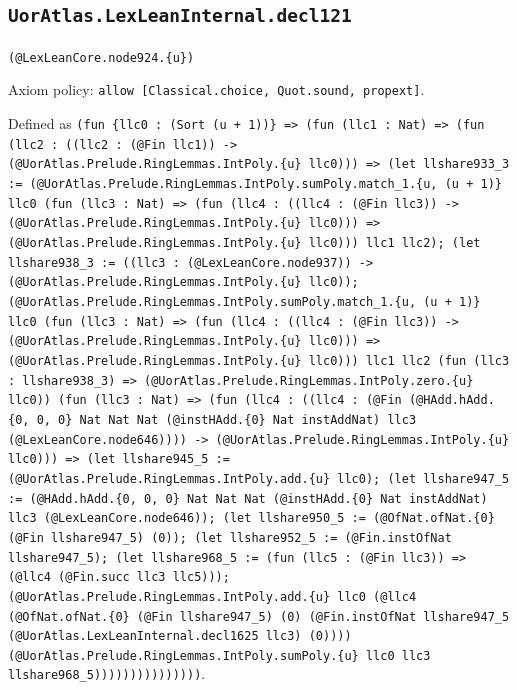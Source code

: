 \documentclass[11pt]{article}
\begin{document}
\subsection*{\texttt{UorAtlas.LexLeanInternal.decl121}}
\noindent\texttt{(@LexLeanCore.node924.\{u\})}\par
\noindent Axiom policy: \texttt{allow [Classical.choice, Quot.sound, propext]}.\par
\noindent Defined as \texttt{(fun \{llc0 : (Sort (u + 1))\} => (fun (llc1 : Nat) => (fun (llc2 : ((llc2 : (@Fin llc1)) -> (@UorAtlas.Prelude.RingLemmas.IntPoly.\{u\} llc0))) => (let llshare933\_3 := (@UorAtlas.Prelude.RingLemmas.IntPoly.sumPoly.match\_1.\{u, (u + 1)\} llc0 (fun (llc3 : Nat) => (fun (llc4 : ((llc4 : (@Fin llc3)) -> (@UorAtlas.Prelude.RingLemmas.IntPoly.\{u\} llc0))) => (@UorAtlas.Prelude.RingLemmas.IntPoly.\{u\} llc0))) llc1 llc2); (let llshare938\_3 := ((llc3 : (@LexLeanCore.node937)) -> (@UorAtlas.Prelude.RingLemmas.IntPoly.\{u\} llc0)); (@UorAtlas.Prelude.RingLemmas.IntPoly.sumPoly.match\_1.\{u, (u + 1)\} llc0 (fun (llc3 : Nat) => (fun (llc4 : ((llc4 : (@Fin llc3)) -> (@UorAtlas.Prelude.RingLemmas.IntPoly.\{u\} llc0))) => (@UorAtlas.Prelude.RingLemmas.IntPoly.\{u\} llc0))) llc1 llc2 (fun (llc3 : llshare938\_3) => (@UorAtlas.Prelude.RingLemmas.IntPoly.zero.\{u\} llc0)) (fun (llc3 : Nat) => (fun (llc4 : ((llc4 : (@Fin (@HAdd.hAdd.\{0, 0, 0\} Nat Nat Nat (@instHAdd.\{0\} Nat instAddNat) llc3 (@LexLeanCore.node646)))) -> (@UorAtlas.Prelude.RingLemmas.IntPoly.\{u\} llc0))) => (let llshare945\_5 := (@UorAtlas.Prelude.RingLemmas.IntPoly.add.\{u\} llc0); (let llshare947\_5 := (@HAdd.hAdd.\{0, 0, 0\} Nat Nat Nat (@instHAdd.\{0\} Nat instAddNat) llc3 (@LexLeanCore.node646)); (let llshare950\_5 := (@OfNat.ofNat.\{0\} (@Fin llshare947\_5) (0)); (let llshare952\_5 := (@Fin.instOfNat llshare947\_5); (let llshare968\_5 := (fun (llc5 : (@Fin llc3)) => (@llc4 (@Fin.succ llc3 llc5))); (@UorAtlas.Prelude.RingLemmas.IntPoly.add.\{u\} llc0 (@llc4 (@OfNat.ofNat.\{0\} (@Fin llshare947\_5) (0) (@Fin.instOfNat llshare947\_5 (@UorAtlas.LexLeanInternal.decl1625 llc3) (0)))) (@UorAtlas.Prelude.RingLemmas.IntPoly.sumPoly.\{u\} llc0 llc3 llshare968\_5)))))))))))))))}.\par
\end{document}
